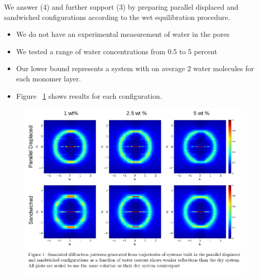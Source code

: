 \documentclass{article}
\begin{document}
  We answer (4) and further support (3) by preparing parallel displaced and
  sandwiched configurations according to the wet equilibration procedure.
  \begin{itemize}
	\item We do not have an experimental measurement of water in the pores
	\item We tested a range of water concentrations from 0.5 to 5 percent %
	\item Our lower bound represents a system with on average 2 water 
	molecules for each monomer layer.
	\item Figure ~\ref{fig:solvation} shows results for each configuration.
  \end{itemize}

  \begin{figure}[ht]
	\centering
	\includegraphics[width=\textwidth]{solvation.png}  %
	\label{fig:solvation}
  \end{figure}
\end{document}
